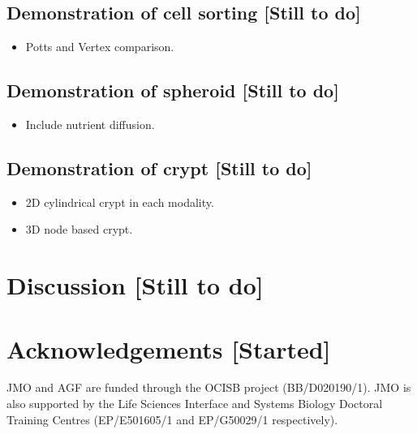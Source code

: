 \documentclass[a4paper,12pt]{article}
\newcommand{\todo}{[Started]}
\newcommand{\tostart}{[Still to do]}
\begin{document}
\subsection{Demonstration of cell sorting \tostart} \label{sec:cell_sorting}
\begin{itemize}
 \item Potts and Vertex comparison.
\end{itemize}

\subsection{Demonstration of spheroid \tostart} \label{sec:spheroid}
\begin{itemize}
 \item Include nutrient diffusion.
\end{itemize}

\subsection{Demonstration of crypt \tostart} \label{sec:crypt}
\begin{itemize}
  \item 2D cylindrical crypt in each modality. 
  \item 3D node based crypt.
\end{itemize}


\section{Discussion \tostart} \label{sec:discussion}

\section*{Acknowledgements \todo}
JMO and AGF are funded through the OCISB project (BB/D020190/1). JMO is also supported by the Life Sciences Interface and Systems Biology Doctoral Training Centres (EP/E501605/1 and EP/G50029/1 respectively).

\clearpage

{}

\end{document}
